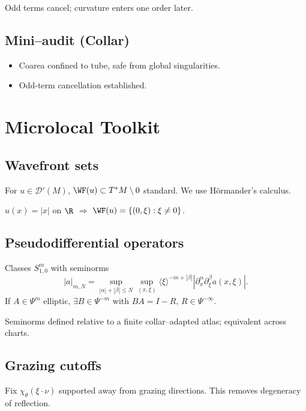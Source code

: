 \begin{remark}
Odd terms cancel; curvature enters one order later.
\end{remark}

\subsection*{Mini–audit (Collar)}
\begin{itemize}
  \item Coarea confined to tube, safe from global singularities.
  \item Odd-term cancellation established.
\end{itemize}

\section{Microlocal Toolkit}
\label{sec:microlocal-core}

\subsection{Wavefront sets}
For $u\in\mathcal D'(M)$, $\WF(u)\subset T^*M\setminus0$ standard. 
We use Hörmander’s calculus.

\begin{example}
$u(x)=|x|$ on $\R$ $\Rightarrow$ $\WF(u)=\{(0,\xi):\xi\ne0\}$.
\end{example}

\subsection{Pseudodifferential operators}
Classes $S^m_{1,0}$ with seminorms
\[
|a|_{m,N}=\sup_{|\alpha|+|\beta|\le N}\sup_{(x,\xi)} \langle\xi\rangle^{-m+|\beta|}|\partial_x^\alpha \partial_\xi^\beta a(x,\xi)|.
\]
If $A\in\Psi^m$ elliptic, $\exists B\in\Psi^{-m}$ with $BA=I-R$, $R\in\Psi^{-\infty}$.

\begin{remark}
Seminorms defined relative to a finite collar–adapted atlas; equivalent across charts.
\end{remark}

\subsection{Grazing cutoffs}
Fix $\chi_\theta(\xi\cdot\nu)$ supported away from grazing directions. 
This removes degeneracy of reflection.

